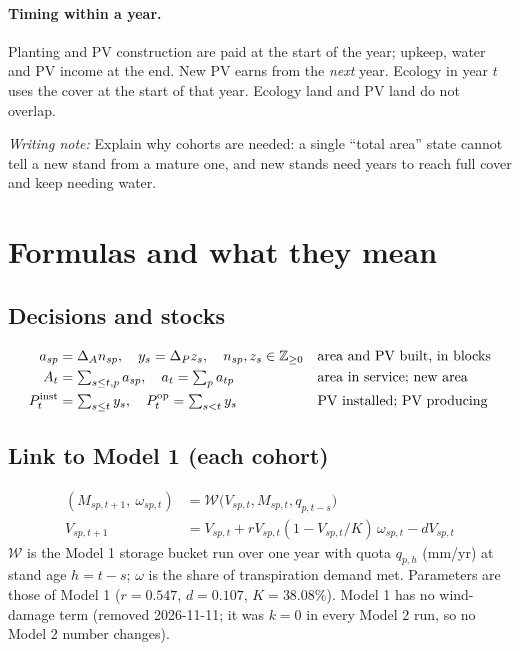 \documentclass[11pt,a4paper]{article}
\newcommand{\say}[1]{\par\smallskip\noindent\textcolor{teal!70!black}{\textit{Writing note:} #1}\par\smallskip}
\begin{document}
\paragraph{Timing within a year.} Planting and PV construction are paid at the start of the year;
upkeep, water and PV income at the end. New PV earns from the \emph{next} year. Ecology in year $t$ uses the
cover at the start of that year. Ecology land and PV land do not overlap.

\say{Explain why cohorts are needed: a single ``total area'' state cannot tell a new stand from a mature one,
and new stands need years to reach full cover and keep needing water.}

\section{Formulas and what they mean}

\subsection{Decisions and stocks}
\begin{align}
a_{sp}&=\Delta_A n_{sp},\quad y_s=\Delta_P z_s,\quad n_{sp},z_s\in\mathbb Z_{\ge0} &&\text{area and PV built, in blocks}\label{eq:blocks}\\
A_t&=\textstyle\sum_{s\le t,p}a_{sp},\quad a_t=\sum_pa_{tp} &&\text{area in service; new area}\\
P_t^{\rm inst}&=\textstyle\sum_{s\le t}y_s,\quad P_t^{\rm op}=\sum_{s<t}y_s &&\text{PV installed; PV producing}
\end{align}

\subsection{Link to Model 1 (each cohort)}
\begin{align}
(M_{sp,t+1},\ \omega_{sp,t})&=\mathcal W\big(V_{sp,t},M_{sp,t},q_{p,t-s}\big)\label{eq:bucket}\\
V_{sp,t+1}&=V_{sp,t}+rV_{sp,t}(1-V_{sp,t}/K)\,\omega_{sp,t}-dV_{sp,t}\label{eq:veg}
\end{align}
$\mathcal W$ is the Model 1 storage bucket run over one year with quota $q_{p,h}$ (mm/yr) at stand age $h=t-s$;
$\omega$ is the share of transpiration demand met. Parameters are those of Model 1 ($r=0.547$, $d=0.107$, $K=38.08\%$). Model 1 has no wind-damage term (removed 2026-11-11; it was $k=0$ in every Model 2 run, so no Model 2 number changes).
\end{document}
